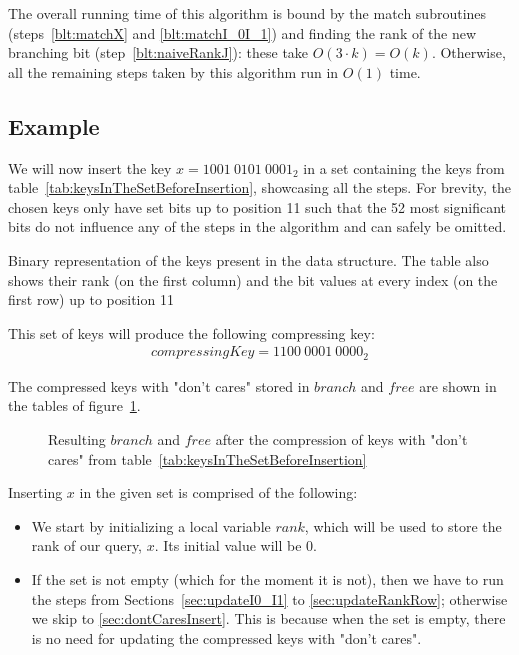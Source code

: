 The overall running time of this algorithm is bound by the match subroutines (steps~\ref{blt:matchX} and \ref{blt:matchI_0I_1}) and finding the rank of the new branching bit (step~\ref{blt:naiveRankJ}): these take $O(3\cdot k) = O(k)$. Otherwise, all the remaining steps taken by this algorithm run in $O(1)$ time.

\subsection{Example} \label{sec:dontCaresInsertExample}

We will now insert the key $x = 1001\ 0101\ 0001_2$ in a set containing the keys from table~\ref{tab:keysInTheSetBeforeInsertion}, showcasing all the steps. For brevity, the chosen keys only have set bits up to position 11 such that the 52 most significant bits do not influence any of the steps in the algorithm and can safely be omitted.

\begin{table}[H]
\centering

\caption[Example set of keys in binary]{Binary representation of the keys present in the data structure. The table also shows their rank (on the first column) and the bit values at every index (on the first row) up to position 11}
\label{tab:keysInTheSetBeforeInsertion}
\end{table}

This set of keys will produce the following compressing key:
\begin{align*}
    compressingKey = 1100\ 0001\ 0000_2
\end{align*}

The compressed keys with "don't cares" stored in $branch$ and $free$ are shown in the tables of figure~\ref{fig:branchAndFreeBeforeInsertion}.

\begin{figure}[H]
\centering

\caption{Resulting $branch$ and $free$ after the compression of keys with "don't cares" from table~\ref{tab:keysInTheSetBeforeInsertion}}
\label{fig:branchAndFreeBeforeInsertion}
\end{figure}

Inserting $x$ in the given set is comprised of the following:

\begin{itemize}
    \item
    We start by initializing a local variable $rank$, which will be used to store the rank of our query, $x$. Its initial value will be $0$.
    
    \item
    If the set is not empty (which for the moment it is not), then we have to run the steps from Sections~\ref{sec:updateI0_I1} to \ref{sec:updateRankRow}; otherwise we skip to \ref{sec:dontCaresInsert}. This is because when the set is empty, there is no need for updating the compressed keys with "don't cares".
\end{itemize}

